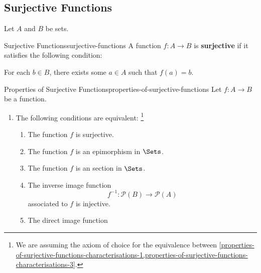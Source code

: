 \subsection{Surjective Functions}\label{subsection-surjective-functions}
Let $A$ and $B$ be sets.
\begin{definition}{Surjective Functions}{surjective-functions}%
    A function $f\colon A\to B$ is \textbf{surjective} if it satisfies the following condition:
    \begin{itemize}
        \itemstar For each $b\in B$, there exists some $a\in A$ such that $f(a)=b$.
    \end{itemize}
\end{definition}
\begin{proposition}{Properties of Surjective Functions}{properties-of-surjective-functions}%
    Let $f\colon A\to B$ be a function.
    \begin{enumerate}
        \item\label{properties-of-surjective-functions-characterisations}The following conditions are equivalent:%
            \footnote{%
                We are assuming the axiom of choice for the equivalence between \cref{properties-of-surjective-functions-characterisations-1,properties-of-surjective-functions-characterisations-3}.
                \par\vspace*{\TCBBoxCorrection}
            }%
            \begin{enumerate}
                \item\label{properties-of-surjective-functions-characterisations-1}The function $f$ is surjective.
                \item\label{properties-of-surjective-functions-characterisations-2}The function $f$ is an epimorphism in $\Sets$.
                \item\label{properties-of-surjective-functions-characterisations-3}The function $f$ is an section in $\Sets$.
                \item\label{properties-of-surjective-functions-characterisations-4}The inverse image function
                    \[
                        f^{-1}%
                        \colon%
                        \mathcal{P}(B)%
                        \to%
                        \mathcal{P}(A)%
                    \]%
                    associated to $f$ is injective.
                \item\label{properties-of-surjective-functions-characterisations-5}The direct image function

\end{enumerate}
\end{enumerate}
\end{proposition}
